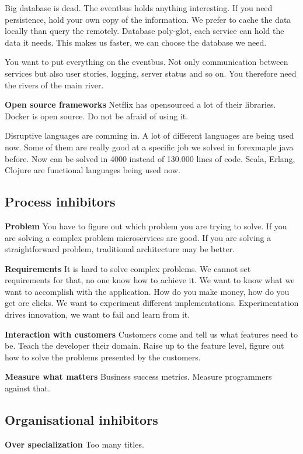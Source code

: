 Big database is dead. The eventbus holds anything interesting. If you need persistence, hold your own copy of the information. We prefer to cache the data locally than query the remotely. Database poly-glot, each service can hold the data it needs. This makes us faster, we can choose the database we need.

You want to put everything on the eventbus. Not only communication between services but also user stories, logging, server status and so on. You therefore need the rivers of the main river.

\textbf{Open source frameworks}
Netflix has opensourced a lot of their libraries. Docker is open source. Do not be afraid of using it.

Disruptive languages are comming in. A lot of different languages are being used now. Some of them are really good at a specific job we solved in forexmaple java before. Now can be solved in 4000 instead of 130.000 lines of code. Scala, Erlang, Clojure are functional languages being used now.


\subsection{Process inhibitors}
\textbf{Problem}
You have to figure out which problem you are trying to solve. If you are solving a complex problem microservices are good. If you are solving a straightforward problem, traditional architecture may be better.

\textbf{Requirements}
It is hard to solve complex problems. We cannot set requirements for that, no one know how to achieve it. We want to know what we want to accomplish with the application. How do you make money, how do you get ore clicks. We want to experiment different implementations. Experimentation drives innovation, we want to fail and learn from it. 

\textbf{Interaction with customers}
Customers come and tell us what features need to be. Teach the developer their domain. Raise up to the feature level, figure out how to solve the problems presented by the customers.

\textbf{Measure what matters}
Business success metrics. Measure programmers against that. 

\subsection{Organisational inhibitors}
\textbf{Over specialization}
Too many titles. 

